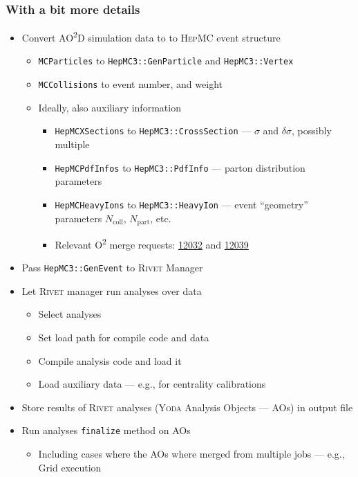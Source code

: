 \documentclass[compress,table,8pt]{beamer}
\newcommand\Rivet{{\scshape Rivet}}
\newcommand\Yoda{{\scshape Yoda}}
\newcommand\HepMC{{\scshape HepMC}}
\newcommand\Otwo{O\textsuperscript{2}}
\newcommand\AOD{AO\textsuperscript{2}D}
\begin{document}
\begin{frame}
  \frametitle{With a bit more details}
  \begin{itemize}
  \item<+-> Convert \AOD{} simulation data to to \HepMC{} event structure
    \begin{itemize}
    \item \texttt{MCParticles} to \texttt{HepMC3::GenParticle} and
      \texttt{HepMC3::Vertex}
    \item \texttt{MCCollisions} to event number, and weight
    \item Ideally, also auxiliary information
      \begin{itemize}
      \item \texttt{HepMCXSections} to \texttt{HepMC3::CrossSection}
        --- $\sigma$ and $\delta\sigma$, possibly multiple
      \item \texttt{HepMCPdfInfos} to \texttt{HepMC3::PdfInfo} ---
        parton distribution parameters
      \item \texttt{HepMCHeavyIons} to \texttt{HepMC3::HeavyIon} ---
        event ``geometry'' parameters $N_{\mathrm{coll}}$,
        $N_{\mathrm{part}}$, etc.
      \item Relevant \Otwo{} merge requests:
        \href{https://github.com/AliceO2Group/AliceO2/pull/12032}{12032} and
        \href{https://github.com/AliceO2Group/AliceO2/pull/12039}{12039}
      \end{itemize}
    \end{itemize}
  \item<+-> Pass \texttt{HepMC3::GenEvent} to \Rivet{} Manager
  \item<+-> Let \Rivet{} manager run analyses over data
    \begin{itemize}
    \item Select analyses
    \item Set load path for compile code and data
    \item Compile analysis code and load it
    \item Load auxiliary data --- e.g., for centrality calibrations
    \end{itemize}
  \item<+-> Store results of \Rivet{} analyses (\Yoda{} Analysis Objects
    --- AOs) in output file
  \item<+-> Run analyses \texttt{finalize} method on AOs
    \begin{itemize}
    \item Including cases where the AOs where merged from multiple
      jobs --- e.g., Grid execution
    \end{itemize}
  \end{itemize}
\end{frame}
\end{document}

